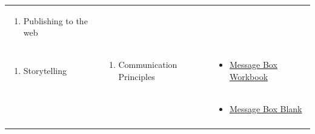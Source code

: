 \documentclass[
]{book}
\providecommand{\tightlist}{%
  \setlength{\itemsep}{0pt}\setlength{\parskip}{0pt}}
\begin{document}
\begin{longtable}[]{@{}lll@{}}
\begin{minipage}[t]{0.34\columnwidth}
\begin{enumerate}
\def\labelenumi{\arabic{enumi}.}
\setcounter{enumi}{6}
\tightlist
\item
  Publishing to the web
\end{enumerate}\strut
\end{minipage} & \begin{minipage}[t]{0.42\columnwidth}\raggedright
\strut
\end{minipage}\tabularnewline
\begin{minipage}[t]{0.15\columnwidth}\raggedright
\begin{enumerate}
\def\labelenumi{\arabic{enumi}.}
\setcounter{enumi}{3}
\tightlist
\item
  Storytelling
\end{enumerate}\strut
\end{minipage} & \begin{minipage}[t]{0.34\columnwidth}\raggedright
\begin{enumerate}
\def\labelenumi{\arabic{enumi}.}
\tightlist
\item
  Communication Principles
\end{enumerate}\strut
\end{minipage} & \begin{minipage}[t]{0.42\columnwidth}\raggedright
\begin{itemize}
\tightlist
\item
  \href{https://www.compassscicomm.org/wp-content/uploads/2020/05/The-Message-Box-Workbook.pdf}{Message Box Workbook}
\end{itemize}\strut
\end{minipage}\tabularnewline
\begin{minipage}[t]{0.15\columnwidth}\raggedright
\strut
\end{minipage} & \begin{minipage}[t]{0.34\columnwidth}\raggedright
\strut
\end{minipage} & \begin{minipage}[t]{0.42\columnwidth}\raggedright
\begin{itemize}
\tightlist
\item
  \href{files/Message-Box-Blank.pdf}{Message Box Blank}
\end{itemize}\strut
\end{minipage}\tabularnewline
\begin{minipage}[t]{0.15\columnwidth}\raggedright
\strut
\end{minipage} & \begin{minipage}[t]{0.34\columnwidth}\raggedright

\end{minipage}
\end{longtable}
\end{document}
